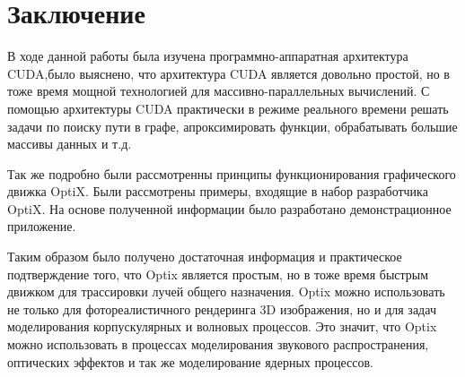 \section*{\centering Заключение}

В ходе данной работы была изучена  программно-аппаратная архитектура CUDA,было выяснено, что архитектура CUDA является довольно простой, но в тоже время мощной технологией для массивно-параллельных вычислений. С помощью архитектуры CUDA практически в режиме реального времени решать задачи по поиску пути в графе, апроксимировать функции, обрабатывать большие массивы данных и т.д.

 Так же подробно были рассмотренны принципы функционирования графического движка OptiX. Были рассмотрены примеры, входящие в набор разработчика OptiX. На основе полученной информации было разработано демонстрационное приложение. 

Таким образом было получено достаточная информация и практическое подтверждение того, что Optix является простым, но в тоже время быстрым движком для трассировки лучей общего назначения. Optix можно использовать не только для фотореалистичного рендеринга 3D изображения, но и для задач моделирования корпускулярных и волновых процессов. Это значит, что Optix можно использовать в процессах моделирования звукового распространения, оптических эффектов и так же моделирование ядерных процессов. 